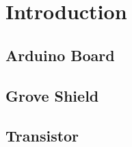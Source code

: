 \section{Introduction}

\subsection{Arduino Board}

\subsection{Grove Shield}

\subsection{Transistor}

